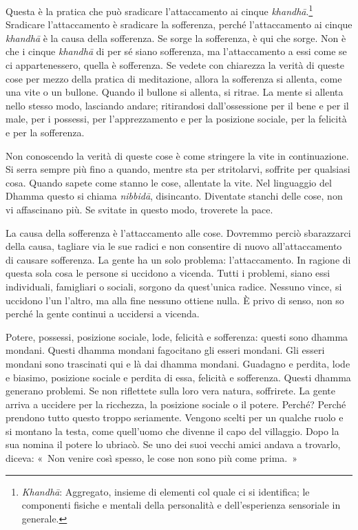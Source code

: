 Questa è la pratica che può sradicare l'attaccamento ai cinque
\emph{khandhā}.\footnote{\emph{Khandhā}: Aggregato, insieme di elementi
  col quale ci si identifica; le componenti fisiche e mentali della
  personalità e dell'esperienza sensoriale in generale.} Sradicare
l'attaccamento è sradicare la sofferenza, perché l'attaccamento ai
cinque \emph{khandhā} è la causa della sofferenza. Se sorge la
sofferenza, è qui che sorge. Non è che i cinque \emph{khandhā} di per sé
siano sofferenza, ma l'attaccamento a essi come se ci appartenessero,
quella è sofferenza. Se vedete con chiarezza la verità di queste cose
per mezzo della pratica di meditazione, allora la sofferenza si allenta,
come una vite o un bullone. Quando il bullone si allenta, si ritrae. La
mente si allenta nello stesso modo, lasciando andare; ritirandosi
dall'ossessione per il bene e per il male, per i possessi, per
l'apprezzamento e per la posizione sociale, per la felicità e per la
sofferenza.

Non conoscendo la verità di queste cose è come stringere la vite in
continuazione. Si serra sempre più fino a quando, mentre sta per
stritolarvi, soffrite per qualsiasi cosa. Quando sapete come stanno le
cose, allentate la vite. Nel linguaggio del Dhamma questo si chiama
\emph{nibbidā}, disincanto. Diventate stanchi delle cose, non vi
affascinano più. Se svitate in questo modo, troverete la pace.

La causa della sofferenza è l'attaccamento alle cose. Dovremmo perciò
sbarazzarci della causa, tagliare via le sue radici e non consentire di
nuovo all'attaccamento di causare sofferenza. La gente ha un solo
problema: l'attaccamento. In ragione di questa sola cosa le persone si
uccidono a vicenda. Tutti i problemi, siano essi individuali, famigliari
o sociali, sorgono da quest'unica radice. Nessuno vince, si uccidono
l'un l'altro, ma alla fine nessuno ottiene nulla. È privo di senso, non
so perché la gente continui a uccidersi a vicenda.

Potere, possessi, posizione sociale, lode, felicità e sofferenza: questi
sono dhamma mondani. Questi dhamma mondani fagocitano gli
esseri mondani. Gli esseri mondani sono trascinati qui e là dai
dhamma mondani. Guadagno e perdita, lode e biasimo, posizione
sociale e perdita di essa, felicità e sofferenza. Questi dhamma
generano problemi. Se non riflettete sulla loro vera natura, soffrirete.
La gente arriva a uccidere per la ricchezza, la posizione sociale o il
potere. Perché? Perché prendono tutto questo troppo seriamente. Vengono
scelti per un qualche ruolo e si montano la testa, come quell'uomo che
divenne il capo del villaggio. Dopo la sua nomina il potere lo ubriacò.
Se uno dei suoi vecchi amici andava a trovarlo, diceva: «~Non venire
così spesso, le cose non sono più come prima.~»

